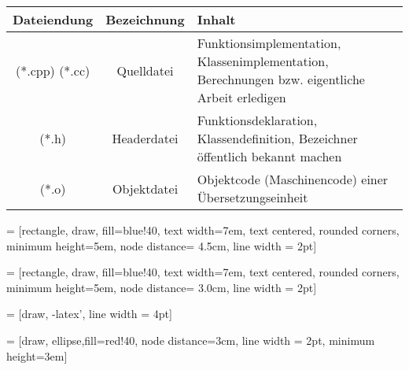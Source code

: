 \documentclass[a4paper]{report}
\theoremstyle{nonumberplain}
\begin{document}
\begin{center}
\begin{tabular}{|c|c|p{10cm}|}
	\hline
	Dateiendung & Bezeichnung & Inhalt \\
	\hline
	(*.cpp) (*.cc) & Quelldatei & Funktionsimplementation, Klassenimplementation, \newline Berechnungen bzw. eigentliche Arbeit erledigen \\ \hline
	(*.h) & Headerdatei & Funktionsdeklaration, Klassendefinition, \newline Bezeichner öffentlich bekannt machen \\
	\hline
	(*.o) & Objektdatei & Objektcode (Maschinencode) einer Übersetzungseinheit\\
	\hline
\end{tabular}

\vspace{4ex}

 = [rectangle, draw, fill=blue!40, 
text width=7em, text centered, rounded corners, minimum height=5em, node distance= 4.5cm, line width = 2pt]


 = [rectangle, draw, fill=blue!40, 
text width=7em, text centered, rounded corners, minimum height=5em, node distance= 3.0cm, line width = 2pt]


 = [draw, -latex', line width = 4pt]


 = [draw, ellipse,fill=red!40, node distance=3cm, line width = 2pt,
minimum height=3em]

{\large

}
\end{center}
\end{document}
